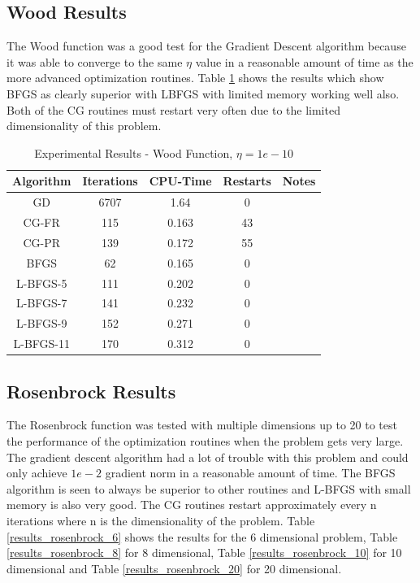 \documentclass[12pt]{amsart}
\begin{document}
\subsection{Wood Results}
The Wood function was a good test for the Gradient Descent algorithm because it was able to converge to the same $\eta$ value in a reasonable amount of time as the more advanced optimization routines.  Table \ref{results_table_wood} shows the results which show BFGS as clearly superior with LBFGS with limited memory working well also.  Both of the CG routines must restart very often due to the limited dimensionality of this problem. 
\begin{table}
\caption{Experimental Results - Wood Function, $\eta=1e-10$}
\label{results_table_wood}
\begin{center}
\begin{tabular}{|c||c||c||c||c|}
\hline
Algorithm & Iterations & CPU-Time & Restarts & Notes\\
\hline
GD & 6707 & 1.64 & 0 & \\
\hline
CG-FR & 115 & 0.163 & 43 & \\
\hline
CG-PR & 139 & 0.172 & 55 & \\
\hline
BFGS & 62 & 0.165 & 0 & \\
\hline
L-BFGS-5 & 111 & 0.202 & 0 &\\
\hline
L-BFGS-7 & 141 & 0.232 & 0 &\\
\hline
L-BFGS-9 & 152 & 0.271 & 0 &\\
\hline
L-BFGS-11 & 170 & 0.312 & 0 &\\
\hline
\end{tabular}
\end{center}
\end{table}

\subsection{Rosenbrock Results}
The Rosenbrock function was tested with multiple dimensions up to 20 to test the performance of the optimization routines when the problem gets very large.  The gradient descent algorithm had a lot of trouble with this problem and could only achieve $1e-2$ gradient norm in a reasonable amount of time.  The BFGS algorithm is seen to always be superior to other routines and L-BFGS with small memory is also very good.  The CG routines restart approximately every n iterations where n is the dimensionality of the problem.  Table \ref{results_rosenbrock_6} shows the results for the 6 dimensional problem, Table \ref{results_rosenbrock_8} for 8 dimensional, Table \ref{results_rosenbrock_10} for 10 dimensional and Table \ref{results_rosenbrock_20} for 20 dimensional.
\end{document}
